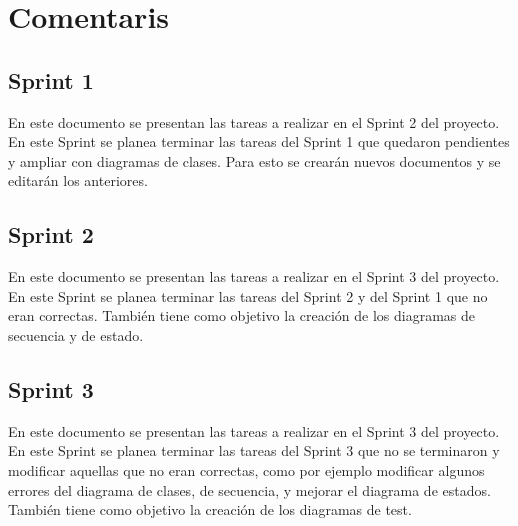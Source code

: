 \section{Comentaris}


\subsection{Sprint 1}

En este documento se presentan las tareas a realizar en el Sprint 2 del proyecto. En este Sprint se planea terminar las tareas del Sprint 1 que quedaron pendientes y ampliar con diagramas de clases. Para esto se crearán nuevos documentos y se editarán los anteriores.


\subsection{Sprint 2}
En este documento se presentan las tareas a realizar en el Sprint 3 del proyecto. En este Sprint se planea terminar las tareas del Sprint 2 y del Sprint 1 que no eran correctas. También tiene como objetivo la creación de los diagramas de secuencia y de estado.


\subsection{Sprint 3}
En este documento se presentan las tareas a realizar en el Sprint 3 del proyecto. En este Sprint se planea terminar las tareas del Sprint 3 que no se terminaron y modificar aquellas que no eran correctas, como por ejemplo modificar algunos errores del diagrama de clases, de secuencia, y mejorar el diagrama de estados. También tiene como objetivo la creación de los diagramas de test.